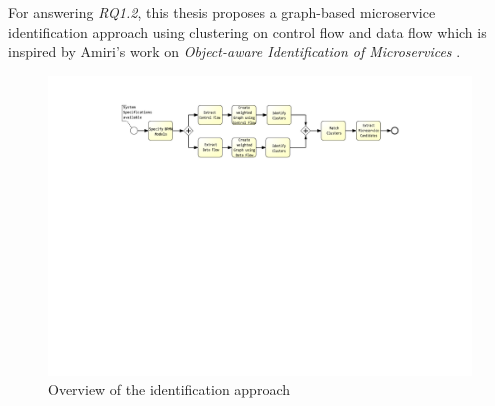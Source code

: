 \noindent
For answering \textit{RQ1.2}, this thesis proposes a graph-based microservice identification approach using clustering on control flow and data flow which is  inspired by Amiri’s work on \textit{Object-aware Identification of Microservices} \cite{ObjectAwareAmiri}. \\



\begin{figure}[h!]
	\includegraphics[width=\textwidth, trim={7.5cm 15.3cm 5.0cm 1.5cm}]{img/ThesisProcess.pdf}
	\caption{Overview of the identification approach}
	\label{fig:thesisProcess}
\end{figure}

